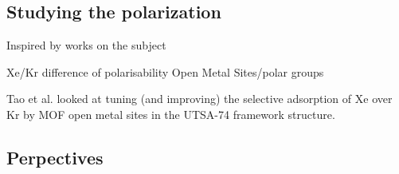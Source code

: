 \documentclass[main]{subfiles}
\begin{document}
\subsection{Studying the polarization}

Inspired by works on the subject\autocite{Lachet_1998,Becker_2017} 


Xe/Kr difference of polarisability
Open Metal Sites/polar groups

Tao et al.\autocite{Tao_2020} looked at tuning (and improving) the selective adsorption of Xe over Kr by MOF open metal sites in the UTSA-74 framework structure.


\subsection{Perpectives}

\OnlyInSubfile{\printglobalbibliography}
\end{document}
